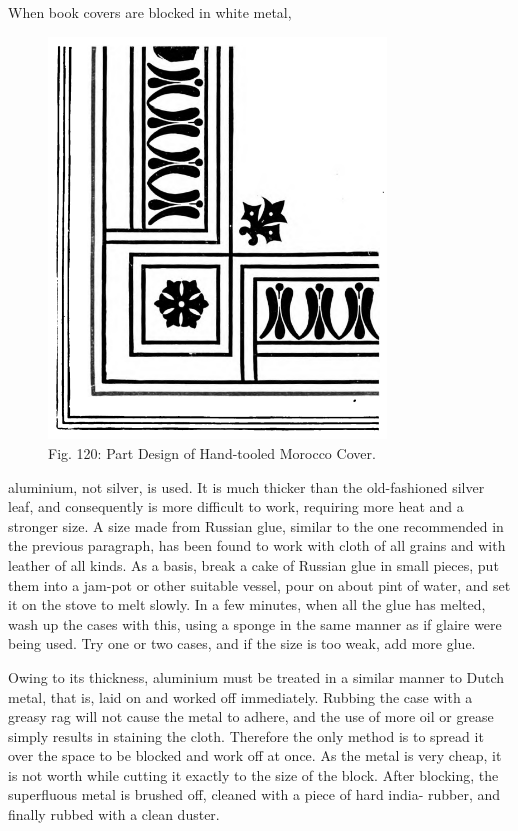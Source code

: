 \documentclass[twoside]{book}
\begin{document}
When book covers are blocked in white metal,
	\begin{figure}[h]
		\centering
		\includegraphics[width=0.8\textwidth]{Figures/_120.png}
		\caption*{Fig. 120: Part Design of Hand-tooled Morocco Cover.}
	\end{figure}
aluminium, not silver, is used. It is much thicker
than the old-fashioned silver leaf, and consequently
is more difficult to work, requiring more heat and
a stronger size. A size made from Russian glue,
similar to the one recommended in the previous
paragraph, has been found to work with cloth of all
\pagebreak
grains and with leather of all kinds. As a basis,
break a cake of Russian glue in small pieces, put
them into a jam-pot or other suitable vessel, pour
on about pint of water, and set it on the stove to
melt slowly. In a few minutes, when all the glue
has melted, wash up the cases with this, using a
sponge in the same manner as if glaire were being
used. Try one or two cases, and if the size is too
weak, add more glue.

Owing to its thickness, aluminium must be
treated in a similar manner to Dutch metal, that
is, laid on and worked off immediately. Rubbing
the case with a greasy rag will not cause the metal
to adhere, and the use of more oil or grease simply
results in staining the cloth. Therefore the only
method is to spread it over the space to be blocked
and work off at once. As the metal is very cheap,
it is not worth while cutting it exactly to the size
of the block. After blocking, the superfluous metal
is brushed off, cleaned with a piece of hard india-
rubber, and finally rubbed with a clean duster.
\end{document}
